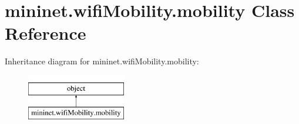 \hypertarget{classmininet_1_1wifiMobility_1_1mobility}{\section{mininet.\-wifi\-Mobility.\-mobility Class Reference}
\label{classmininet_1_1wifiMobility_1_1mobility}
}
Inheritance diagram for mininet.\-wifi\-Mobility.\-mobility\-:\begin{figure}[H]
\begin{center}
\leavevmode
\includegraphics[height=2.000000cm]{classmininet_1_1wifiMobility_1_1mobility}
\end{center}
\end{figure}

